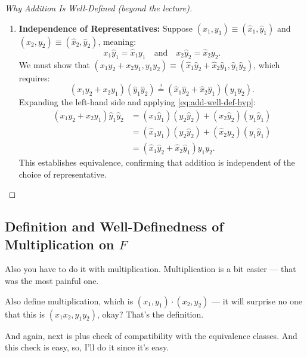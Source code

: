 \begin{content}
\begin{proof}[Why Addition Is Well-Defined (beyond the lecture)]
\begin{enumerate}[label=\textbf{(\arabic*)}]
    \item \textbf{Independence of Representatives:} Suppose $(x_1, y_1) \equiv (\hat{x}_1, \hat{y}_1)$ and $(x_2, y_2) \equiv (\hat{x}_2, \hat{y}_2)$, meaning:
    \begin{equation}\label{eq:add-well-def-hyp}
    x_1 \hat{y}_1 = \hat{x}_1 y_1 \quad \text{and} \quad x_2 \hat{y}_2 = \hat{x}_2 y_2.
    \end{equation}
    We must show that $(x_1 y_2 + x_2 y_1, y_1 y_2) \equiv (\hat{x}_1 \hat{y}_2 + \hat{x}_2 \hat{y}_1, \hat{y}_1 \hat{y}_2)$, which requires:
    \[
    (x_1 y_2 + x_2 y_1)(\hat{y}_1 \hat{y}_2) \overset{?}{=} (\hat{x}_1 \hat{y}_2 + \hat{x}_2 \hat{y}_1)(y_1 y_2).
    \]
    Expanding the left-hand side and applying \eqref{eq:add-well-def-hyp}:
    \begin{align*}
    (x_1 y_2 + x_2 y_1)\hat{y}_1 \hat{y}_2 &= (x_1 \hat{y}_1)(y_2 \hat{y}_2) + (x_2 \hat{y}_2)(y_1 \hat{y}_1) \\
    &= (\hat{x}_1 y_1)(y_2 \hat{y}_2) + (\hat{x}_2 y_2)(y_1 \hat{y}_1) \\
    &= (\hat{x}_1 \hat{y}_2 + \hat{x}_2 \hat{y}_1)y_1 y_2.
    \end{align*}
    This establishes equivalence, confirming that addition is independent of the choice of representative.
\end{enumerate}
\end{proof}
\end{content}

\subsection{Definition and Well-Definedness of Multiplication on \texorpdfstring{$F$}{F}}

\begin{speech}[01:02:20 - 01:03:18]
Also you have to do it with multiplication.  Multiplication is a bit easier --- that was the most painful one.

Also define multiplication,  which is $(x_1, y_1) \cdot (x_2, y_2)$  --- it will surprise no one that this is $(x_1 x_2, y_1 y_2)$, okay?  That's the definition.

And again, next is plus check  of compatibility with the equivalence classes.  And this check is easy, so, I'll do it since it's easy.
\end{speech}

